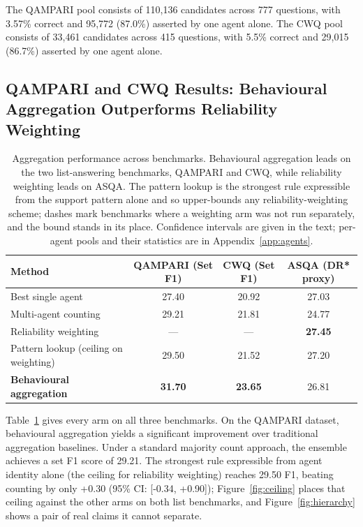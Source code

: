 \documentclass{article}
\begin{document}
The QAMPARI pool consists of 110,136 candidates across 777 questions, with 3.57\% correct and 95,772 (87.0\%) asserted by one agent alone. The CWQ pool consists of 33,461 candidates across 415 questions, with 5.5\% correct and 29,015 (86.7\%) asserted by one agent alone.

\subsection{QAMPARI and CWQ Results: Behavioural Aggregation Outperforms Reliability Weighting}
\label{sec:rq1}

\begin{table}[h]
\centering
\caption{Aggregation performance across benchmarks. Behavioural aggregation leads on the two list-answering benchmarks, QAMPARI and CWQ, while reliability weighting leads on ASQA. The pattern lookup is the strongest rule expressible from the support pattern alone and so upper-bounds any reliability-weighting scheme; dashes mark benchmarks where a weighting arm was not run separately, and the bound stands in its place. Confidence intervals are given in the text; per-agent pools and their statistics are in Appendix~\ref{app:agents}.}
\label{tab:main}
\begin{tabular}{lccc}
\toprule
\textbf{Method} & \textbf{QAMPARI (Set F1)} & \textbf{CWQ (Set F1)} & \textbf{ASQA (DR* proxy)} \\
\midrule
Best single agent & 27.40 & 20.92 & 27.03 \\
Multi-agent counting & 29.21 & 21.81 & 24.77 \\
Reliability weighting & --- & --- & \textbf{27.45} \\
Pattern lookup (ceiling on weighting) & 29.50 & 21.52 & 27.20 \\
\textbf{Behavioural aggregation} & \textbf{31.70} & \textbf{23.65} & 26.81 \\
\bottomrule
\end{tabular}
\end{table}


Table~\ref{tab:main} gives every arm on all three benchmarks. On the QAMPARI dataset, behavioural aggregation yields a significant improvement over traditional aggregation baselines. Under a standard majority count approach, the ensemble achieves a set F1 score of 29.21. The strongest rule expressible from agent identity alone (the ceiling for reliability weighting) reaches 29.50 F1, beating counting by only +0.30 (95\% CI: [-0.34, +0.90]); Figure~\ref{fig:ceiling} places that ceiling against the other arms on both list benchmarks, and Figure~\ref{fig:hierarchy} shows a pair of real claims it cannot separate.
\end{document}
